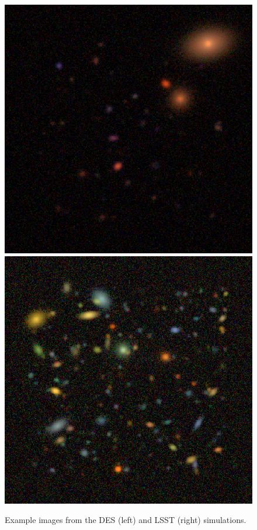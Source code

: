 \documentclass[fleqn,useAMS,usenatbib]{mnras}
\begin{document}
\begin{figure}
    \includegraphics[width=0.9\columnwidth]{figures/des-rgb-000000-crop.png}
    \includegraphics[width=0.9\columnwidth]{figures/lsst-rgb-000003-crop.png}

    \caption{Example images from the DES (left) and LSST (right) simulations.  \label{fig:simimages} }

\end{figure}
\end{document}
